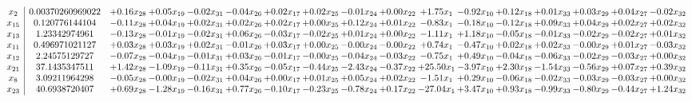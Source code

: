 \documentclass[9pt]{article}
\begin{document}
 \[\begin{array}{c| c c@{\hskip 2pt} c@{\hskip 2pt} c@{\hskip 2pt} c@{\hskip 2pt} c@{\hskip 2pt} c@{\hskip 2pt} c@{\hskip 2pt} c@{\hskip 2pt} c@{\hskip 2pt} c@{\hskip 2pt} c@{\hskip 2pt} c@{\hskip 2pt} c@{\hskip 2pt} c@{\hskip 2pt} c@{\hskip 2pt} }
 x_{2}   &  0.00370260969022 & +  0.16 x_{28} & +  0.05 x_{19} & -0.02 x_{31} & -0.04 x_{26} & +  0.02 x_{17} & +  0.02 x_{25} & -0.01 x_{24} & +  0.00 x_{22} & +  1.75 x_{1} & -0.92 x_{10} & +  0.12 x_{18} & +  0.01 x_{33} & +  0.03 x_{29} & +  0.04 x_{27} & -0.02 x_{32}\\
 x_{15}   &  0.120776144104 & -0.11 x_{28} & +  0.04 x_{19} & +  0.02 x_{31} & +  0.02 x_{26} & +  0.02 x_{17} & +  0.00 x_{25} & +  0.12 x_{24} & +  0.01 x_{22} & -0.83 x_{1} & -0.18 x_{10} & -0.12 x_{18} & +  0.09 x_{33} & +  0.04 x_{29} & +  0.02 x_{27} & +  0.02 x_{32}\\
 x_{13}   &  1.23342974961 & -0.13 x_{28} & -0.01 x_{19} & -0.02 x_{31} & +  0.06 x_{26} & -0.03 x_{17} & -0.02 x_{25} & +  0.01 x_{24} & +  0.00 x_{22} & -1.11 x_{1} & +  1.18 x_{10} & -0.05 x_{18} & -0.01 x_{33} & -0.02 x_{29} & -0.02 x_{27} & +  0.01 x_{32}\\
 x_{11}   &  0.496971021127 & +  0.03 x_{28} & +  0.03 x_{19} & +  0.02 x_{31} & -0.01 x_{26} & +  0.03 x_{17} & +  0.00 x_{25} & -0.00 x_{24} & -0.00 x_{22} & +  0.74 x_{1} & -0.47 x_{10} & +  0.02 x_{18} & +  0.02 x_{33} & -0.00 x_{29} & +  0.01 x_{27} & -0.03 x_{32}\\
 x_{12}   &  2.24575129727 & -0.07 x_{28} & -0.04 x_{19} & -0.01 x_{31} & +  0.03 x_{26} & -0.01 x_{17} & -0.00 x_{25} & -0.04 x_{24} & -0.03 x_{22} & -0.75 x_{1} & +  0.49 x_{10} & -0.04 x_{18} & -0.06 x_{33} & -0.02 x_{29} & -0.03 x_{27} & +  0.00 x_{32}\\
 x_{21}   &  37.1435347511 & +  1.42 x_{28} & -1.09 x_{19} & -0.11 x_{31} & +  0.35 x_{26} & -0.05 x_{17} & -0.44 x_{25} & -2.43 x_{24} & -0.37 x_{22} & + 25.50 x_{1} & -3.97 x_{10} & +  2.30 x_{18} & -1.54 x_{33} & -0.56 x_{29} & +  0.07 x_{27} & +  0.39 x_{32}\\
 x_{8}   &  3.09211964298 & -0.05 x_{28} & -0.00 x_{19} & -0.02 x_{31} & +  0.04 x_{26} & +  0.00 x_{17} & +  0.01 x_{25} & +  0.05 x_{24} & +  0.02 x_{22} & -1.51 x_{1} & +  0.29 x_{10} & -0.06 x_{18} & -0.02 x_{33} & -0.03 x_{29} & -0.03 x_{27} & +  0.00 x_{32}\\
 x_{23}   &  40.6938720407 & +  0.69 x_{28} & -1.28 x_{19} & -0.16 x_{31} & +  0.77 x_{26} & -0.10 x_{17} & -0.23 x_{25} & -0.78 x_{24} & +  0.17 x_{22} & -27.04 x_{1} & +  3.47 x_{10} & +  0.93 x_{18} & -0.99 x_{33} & -0.80 x_{29} & -0.44 x_{27} & +  1.24 x_{32}\\

\end{array}\]
\end{document}
